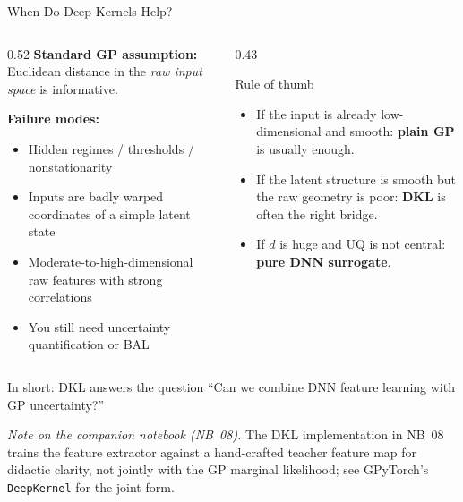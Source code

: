 \documentclass[aspectratio=169,11pt]{beamer}
\newcommand{\emphc}[1]{\textcolor{harvardcrimson}{#1}}
\begin{document}
\begin{frame}[shrink=20]{When Do Deep Kernels Help?}
\begin{columns}[T]
\begin{column}{0.52\textwidth}
\textbf{Standard GP assumption:} Euclidean distance in the \emph{raw input space} is informative.

\vspace{0.2cm}
\textbf{Failure modes:}
\begin{itemize}
  \item Hidden regimes / thresholds / nonstationarity
  \item Inputs are badly warped coordinates of a simple latent state
  \item Moderate-to-high-dimensional raw features with strong correlations
  \item You still need \emphc{uncertainty quantification} or BAL
\end{itemize}
\end{column}

\begin{column}{0.43\textwidth}
\begin{alertblock}{Rule of thumb}
\begin{itemize}
  \item If the input is already low-dimensional and smooth: \textbf{plain GP} is usually enough.
  \item If the latent structure is smooth but the raw geometry is poor: \textbf{DKL} is often the right bridge.
  \item If $d$ is huge and UQ is not central: \textbf{pure DNN surrogate}.
\end{itemize}
\end{alertblock}
\end{column}
\end{columns}

\vspace{0.2cm}
{\small In short: \emphc{DKL answers the question ``Can we combine DNN feature learning with GP uncertainty?''}}

\vspace{0.05em}
{\scriptsize\emph{Note on the companion notebook (NB~08).}  The DKL implementation in NB~08 trains the feature extractor against a hand-crafted teacher feature map for didactic clarity, not jointly with the GP marginal likelihood; see GPyTorch's \texttt{DeepKernel} for the joint form.}
\end{frame}
\end{document}
